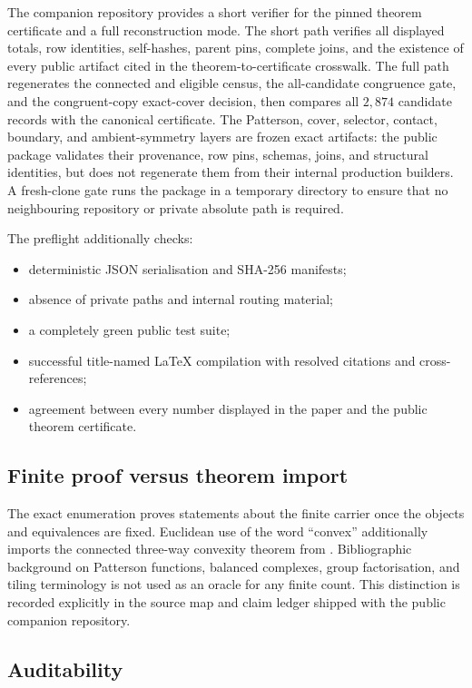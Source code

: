 The companion repository provides a short verifier for the pinned theorem
certificate and a full reconstruction mode.  The short path verifies all
displayed totals, row identities, self-hashes, parent pins, complete joins,
and the existence of every public artifact cited in the
theorem-to-certificate crosswalk.  The full path regenerates the connected
and eligible census, the all-candidate congruence gate, and the
congruent-copy exact-cover decision, then compares all $2{,}874$ candidate
records with the canonical certificate.  The Patterson, cover, selector,
contact, boundary, and ambient-symmetry layers are frozen exact artifacts:
the public package validates their provenance, row pins, schemas, joins, and
structural identities, but does not regenerate them from their internal
production builders.  A fresh-clone gate runs the package in a temporary
directory to ensure that no neighbouring repository or private absolute
path is required.

The preflight additionally checks:
\begin{itemize}[leftmargin=2em]
\item deterministic JSON serialisation and SHA-256 manifests;
\item absence of private paths and internal routing material;
\item a completely green public test suite;
\item successful title-named LaTeX compilation with resolved citations and
cross-references;
\item agreement between every number displayed in the paper and the public
theorem certificate.
\end{itemize}

\subsection{Finite proof versus theorem import}

The exact enumeration proves statements about the finite carrier once the
objects and equivalences are fixed.  Euclidean use of the word ``convex''
additionally imports the connected three-way convexity theorem from
\cite{BabanskyyT2}.  Bibliographic background on Patterson functions,
balanced complexes, group factorisation, and tiling terminology is not used
as an oracle for any finite count.  This distinction is recorded explicitly
in the source map and claim ledger shipped with the public companion
repository.

\subsection{Auditability}

